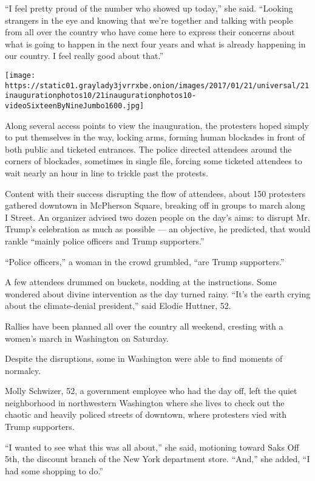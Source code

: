 ``I feel pretty proud of the number who showed up today,'' she said.
``Looking strangers in the eye and knowing that we're together and
talking with people from all over the country who have come here to
express their concerns about what is going to happen in the next four
years and what is already happening in our country. I feel really good
about that.''

\texttt{[image: https://static01.graylady3jvrrxbe.onion/images/2017/01/21/universal/21inaugurationphotos10/21inaugurationphotos10-videoSixteenByNineJumbo1600.jpg]}

Along several access points to view the inauguration, the protesters
hoped simply to put themselves in the way, locking arms, forming human
blockades in front of both public and ticketed entrances. The police
directed attendees around the corners of blockades, sometimes in single
file, forcing some ticketed attendees to wait nearly an hour in line to
trickle past the protests.

Content with their success disrupting the flow of attendees, about 150
protesters gathered downtown in McPherson Square, breaking off in groups
to march along I Street. An organizer advised two dozen people on the
day's aims: to disrupt Mr. Trump's celebration as much as possible ---
an objective, he predicted, that would rankle ``mainly police officers
and Trump supporters.''

``Police officers,'' a woman in the crowd grumbled, ``are Trump
supporters.''

A few attendees drummed on buckets, nodding at the instructions. Some
wondered about divine intervention as the day turned rainy. ``It's the
earth crying about the climate-denial president,'' said Elodie Huttner,
52.

Rallies have been planned all over the country all weekend, cresting
with a women's march in Washington on Saturday.

Despite the disruptions, some in Washington were able to find moments of
normalcy.

Molly Schwizer, 52, a government employee who had the day off, left the
quiet neighborhood in northwestern Washington where she lives to check
out the chaotic and heavily policed streets of downtown, where
protesters vied with Trump supporters.

``I wanted to see what this was all about,'' she said, motioning toward
Saks Off 5th, the discount branch of the New York department store.
``And,'' she added, ``I had some shopping to do.''

